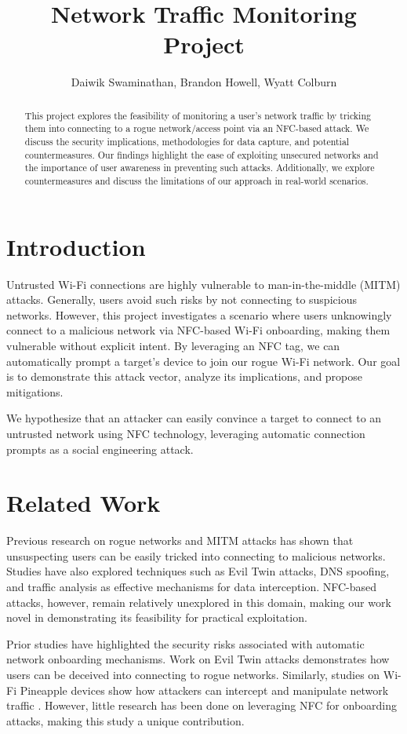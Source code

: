 \documentclass[sigconf]{acmart}
\title{Network Traffic Monitoring Project}
\author{Daiwik Swaminathan, Brandon Howell, Wyatt Colburn}
\affiliation{\institution{California Polytechnic State University, San Luis Obispo}}
\begin{document}
\begin{abstract}
This project explores the feasibility of monitoring a user's network traffic by tricking them into connecting to a rogue network/access point via an NFC-based attack. We discuss the security implications, methodologies for data capture, and potential countermeasures. Our findings highlight the ease of exploiting unsecured networks and the importance of user awareness in preventing such attacks. Additionally, we explore countermeasures and discuss the limitations of our approach in real-world scenarios.
\end{abstract}

\maketitle

\section{Introduction}
Untrusted Wi-Fi connections are highly vulnerable to man-in-the-middle (MITM) attacks. Generally, users avoid such risks by not connecting to suspicious networks. However, this project investigates a scenario where users unknowingly connect to a malicious network via NFC-based Wi-Fi onboarding, making them vulnerable without explicit intent. By leveraging an NFC tag, we can automatically prompt a target's device to join our rogue Wi-Fi network. Our goal is to demonstrate this attack vector, analyze its implications, and propose mitigations.

We hypothesize that an attacker can easily convince a target to connect to an untrusted network using NFC technology, leveraging automatic connection prompts as a social engineering attack.

\section{Related Work}
Previous research on rogue networks and MITM attacks has shown that unsuspecting users can be easily tricked into connecting to malicious networks. Studies have also explored techniques such as Evil Twin attacks, DNS spoofing, and traffic analysis as effective mechanisms for data interception. NFC-based attacks, however, remain relatively unexplored in this domain, making our work novel in demonstrating its feasibility for practical exploitation.

Prior studies have highlighted the security risks associated with automatic network onboarding mechanisms. Work on Evil Twin attacks \cite{eviltwin} demonstrates how users can be deceived into connecting to rogue networks. Similarly, studies on Wi-Fi Pineapple devices show how attackers can intercept and manipulate network traffic \cite{wifipineapple}. However, little research has been done on leveraging NFC for onboarding attacks, making this study a unique contribution.
\end{document}
